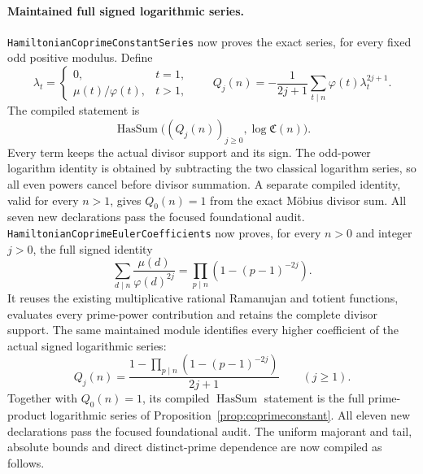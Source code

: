 \paragraph{Maintained full signed logarithmic series.}
\texttt{HamiltonianCoprimeConstantSeries} now proves the exact
series, for every fixed odd positive modulus. Define
\[
 \lambda_t=\begin{cases}0,&t=1,\\
                \mu(t)/\varphi(t),&t>1,\end{cases}
 \qquad
 Q_j(n)=-\frac1{2j+1}\sum_{t\mid n}
                         \varphi(t)\lambda_t^{2j+1}.
\]
The compiled statement is
\[
 \operatorname{HasSum}\bigl((Q_j(n))_{j\geq0},
                              \log\mathfrak C(n)\bigr).
\]
Every term keeps the actual divisor support and its sign.
The odd-power logarithm identity is obtained by subtracting
the two classical logarithm series, so all even powers
cancel before divisor summation. A separate compiled identity,
valid for every \(n>1\), gives \(Q_0(n)=1\) from the exact
M\"obius divisor sum. All seven new declarations pass the
focused foundational audit.
\texttt{HamiltonianCoprimeEulerCoefficients} now proves, for
every \(n>0\) and integer \(j>0\), the full signed identity
\[
 \sum_{d\mid n}\frac{\mu(d)}{\varphi(d)^{2j}}
       =\prod_{p\mid n}\left(1-(p-1)^{-2j}\right).
\]
It reuses the existing multiplicative rational Ramanujan and
totient functions, evaluates every prime-power contribution
and retains the complete divisor support.
The same maintained module identifies every higher coefficient
of the actual signed logarithmic series:
\[
 Q_j(n)=\frac{1-\prod_{p\mid n}(1-(p-1)^{-2j})}{2j+1}
                       \qquad(j\geq1).
\]
Together with \(Q_0(n)=1\), its compiled \(\operatorname{HasSum}\)
statement is the full prime-product logarithmic series of
Proposition~\ref{prop:coprimeconstant}.
All eleven new declarations pass the focused foundational
audit. The uniform majorant and tail, absolute bounds and
direct distinct-prime dependence are now compiled as follows.

